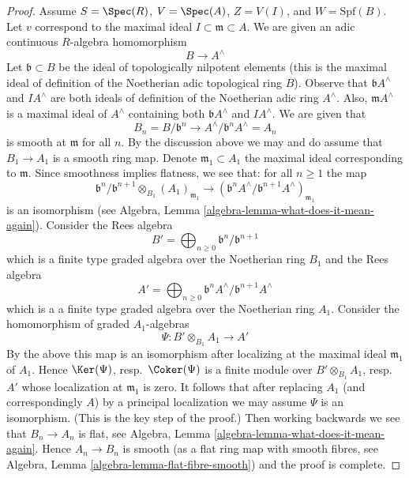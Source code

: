 \begin{proof}
\medskip\noindent
Assume $S = \Spec(R)$, $V = \Spec(A)$, $Z = V(I)$, and $W = \text{Spf}(B)$.
Let $v$ correspond to the maximal ideal $I \subset \mathfrak m \subset A$.
We are given an adic continuous $R$-algebra homomorphism
$$
B \longrightarrow A^\wedge
$$
Let $\mathfrak b \subset B$ be the ideal of topologically nilpotent
elements (this is the maximal ideal of definition of the Noetherian adic
topological ring $B$). Observe that $\mathfrak b A^\wedge$ and
$IA^\wedge$ are both ideals of definition of the Noetherian adic
ring $A^\wedge$. Also, $\mathfrak m A^\wedge$ is a maximal ideal
of $A^\wedge$ containing both $\mathfrak b A^\wedge$ and $IA^\wedge$.
We are given that
$$
B_n = B/\mathfrak b^n \to A^\wedge/\mathfrak b^n A^\wedge = A_n
$$
is smooth at $\mathfrak m$ for all $n$. By the discussion above
we may and do assume that $B_1 \to A_1$ is a smooth ring map.
Denote $\mathfrak m_1 \subset A_1$ the maximal ideal corresponding
to $\mathfrak m$. Since smoothness implies flatness, we see that:
for all $n \geq 1$ the map
$$
\mathfrak b^n/\mathfrak b^{n + 1} \otimes_{B_1} (A_1)_{\mathfrak m_1}
\longrightarrow
\left(\mathfrak b^nA^\wedge/\mathfrak b^{n + 1}A^\wedge\right)_{\mathfrak m_1}
$$
is an isomorphism (see
Algebra, Lemma \ref{algebra-lemma-what-does-it-mean-again}).
Consider the Rees algebra
$$
B' = \bigoplus\nolimits_{n \geq 0} \mathfrak b^n/\mathfrak b^{n + 1}
$$
which is a finite type graded algebra over the Noetherian ring $B_1$ and
the Rees algebra
$$
A' = \bigoplus\nolimits_{n \geq 0}
\mathfrak b^nA^\wedge/\mathfrak b^{n + 1}A^\wedge
$$
which is a a finite type graded algebra over the Noetherian ring $A_1$.
Consider the homomorphism of graded $A_1$-algebras
$$
\Psi : B' \otimes_{B_1} A_1 \longrightarrow A'
$$
By the above this map is an isomorphism after localizing at
the maximal ideal $\mathfrak m_1$ of $A_1$.
Hence $\Ker(\Psi)$, resp.\ $\Coker(\Psi)$ is a finite module
over $B' \otimes_{B_1} A_1$, resp.\ $A'$ whose localization
at $\mathfrak m_1$ is zero. It follows that after replacing
$A_1$ (and correspondingly $A$) by a principal localization
we may assume $\Psi$ is an isomorphism. (This is the key step of the proof.)
Then working backwards we see that $B_n \to A_n$ is flat, see
Algebra, Lemma \ref{algebra-lemma-what-does-it-mean-again}.
Hence $A_n \to B_n$ is smooth (as a flat ring map with smooth
fibres, see Algebra, Lemma \ref{algebra-lemma-flat-fibre-smooth})
and the proof is complete.
\end{proof}
